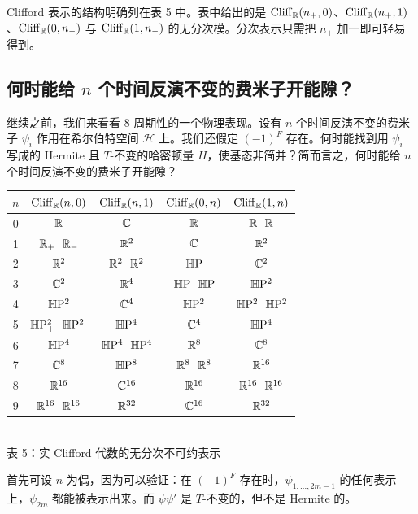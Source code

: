 Clifford 表示的结构明确列在表 5 中。表中给出的是 $\mathrm{Cliff}_{\mathbb{R}}(n_+,0)$、$\mathrm{Cliff}_{\mathbb{R}}(n_+,1)$、$\mathrm{Cliff}_{\mathbb{R}}(0,n_-)$ 与 $\mathrm{Cliff}_{\mathbb{R}}(1,n_-)$ 的无分次模。分次表示只需把 $n_+$ 加一即可轻易得到。

\subsection{何时能给 $n$ 个时间反演不变的费米子开能隙？}

继续之前，我们来看看 8-周期性的一个物理表现。设有 $n$ 个时间反演不变的费米子 $\psi_i$ 作用在希尔伯特空间 $\mathcal{H}$ 上。我们还假定 $(-1)^F$ 存在。何时能找到用 $\psi_i$ 写成的 Hermite 且 $T$-不变的哈密顿量 $H$，使基态非简并？简而言之，何时能给 $n$ 个时间反演不变的费米子开能隙？

\begin{center}
\small
\setlength{\tabcolsep}{4pt}
\renewcommand{\arraystretch}{0.95}
\begin{tabular}{c||c|c||c|c}
\hline
$n$ & $\mathrm{Cliff}_{\mathbb{R}}(n,0)$ & $\mathrm{Cliff}_{\mathbb{R}}(n,1)$
    & $\mathrm{Cliff}_{\mathbb{R}}(0,n)$ & $\mathrm{Cliff}_{\mathbb{R}}(1,n)$\\
\hline
0 & $\mathbb{R}$ & $\mathbb{C}$ & $\mathbb{R}$ & $\R\ \ \R$\\
1 & $\R_+\ \ \R_-$ & $\mathbb{R}^2$ & $\mathbb{C}$ & $\mathbb{R}^2$\\
2 & $\mathbb{R}^2$ & $\R^2\ \ \R^2$ & $\mathbb{H}\mathrm{P}$ & $\mathbb{C}^2$\\
3 & $\mathbb{C}^2$ & $\mathbb{R}^4$ & $\HP\ \ \HP$ & $\mathbb{H}\mathrm{P}^2$\\
4 & $\mathbb{H}\mathrm{P}^2$ & $\mathbb{C}^4$ & $\mathbb{H}\mathrm{P}^2$ & $\HP^2\ \ \HP^2$\\
5 & $\HP^2_+\ \ \HP^2_-$ & $\mathbb{H}\mathrm{P}^4$ & $\mathbb{C}^4$ & $\mathbb{H}\mathrm{P}^4$\\
6 & $\mathbb{H}\mathrm{P}^4$ & $\HP^4\ \ \HP^4$ & $\mathbb{R}^8$ & $\mathbb{C}^8$\\
7 & $\mathbb{C}^8$ & $\mathbb{H}\mathrm{P}^8$ & $\R^8\ \ \R^8$ & $\mathbb{R}^{16}$\\
\hline
8 & $\mathbb{R}^{16}$ & $\mathbb{C}^{16}$ & $\mathbb{R}^{16}$ & $\R^{16}\ \ \R^{16}$\\
9 & $\R^{16}\ \ \R^{16}$ & $\mathbb{R}^{32}$ & $\mathbb{C}^{16}$ & $\mathbb{R}^{32}$\\
\hline
\end{tabular}\\[2pt]
{\small 表 5：实 Clifford 代数的无分次不可约表示}
\end{center}

首先可设 $n$ 为偶，因为可以验证：在 $(-1)^F$ 存在时，$\psi_{1,\dots,2m-1}$ 的任何表示上，$\psi_{2m}$ 都能被表示出来。而 $\psi\psi'$ 是 $T$-不变的，但不是 Hermite 的。

